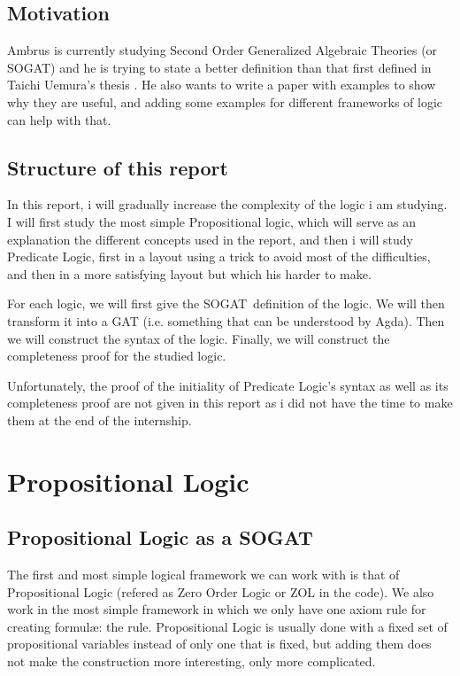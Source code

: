 \documentclass[10pt,a4paper]{article}
\begin{document}
		\subsection{Motivation}
			Ambrus is currently studying Second Order Generalized Algebraic Theories (or SOGAT) and he is trying to state a better definition than that first defined in Taichi Uemura's thesis \cite{UemuraThesis2021}. He also wants to write a paper with examples to show why they are useful, and adding some examples for different frameworks of logic can help with that.
			
		\subsection{Structure of this report}
		
			In this report, i will gradually increase the complexity of the logic i am studying. I will first study the most simple Propositional logic, which will serve as an explanation the different concepts used in the report, and then i will study Predicate Logic, first in a layout using a trick to avoid most of the difficulties, and then in a more satisfying layout but which his harder to make.
			
			For each logic, we will first give the SOGAT definition of the logic. We will then transform it into a GAT (i.e. something that can be understood by Agda). Then we will construct the syntax of the logic. Finally, we will construct the completeness proof for the studied logic.
			
			Unfortunately, the proof of the initiality of Predicate Logic's syntax as well as its completeness proof are not given in this report as i did not have the time to make them at the end of the internship.
			
	\section{Propositional Logic}
		\subsection{Propositional Logic as a SOGAT}
		
			The first and most simple logical framework we can work with is that of Propositional Logic (refered as Zero Order Logic or ZOL in the code). We also work in the most simple framework in which we only have one axiom rule for creating formulæ: the \iotAgda{} rule. Propositional Logic is usually done with a fixed set of propositional variables instead of only one that is fixed, but adding them does not make the construction more interesting, only more complicated.
			
\end{document}
